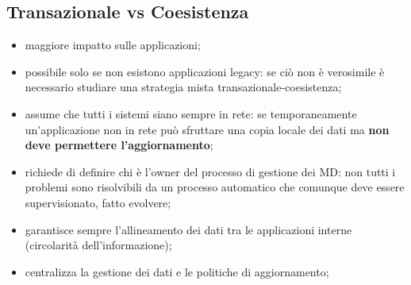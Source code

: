 \documentclass{article}
\begin{document}
\subsection{Transazionale vs Coesistenza}\label{sub:transazionale_vs_coesistenza} %
\begin{note}
    \begin{itemize}
        \item maggiore impatto sulle applicazioni;
        \item possibile solo se non esistono applicazioni legacy: se ciò non è verosimile è necessario studiare una strategia mista transazionale-coesistenza;
        \item assume che tutti i sistemi siano sempre in rete: se temporaneamente un'applicazione non in rete può sfruttare una copia locale dei dati ma \textbf{non deve permettere l'aggiornamento};
        \item richiede di definire chi è l'owner del processo di gestione dei MD: non tutti i problemi sono risolvibili da un processo automatico che comunque deve essere supervisionato, fatto evolvere;
    \end{itemize}
\end{note}
\begin{note}
    \begin{itemize}
        \item garantisce sempre l'allineamento dei dati tra le applicazioni interne (circolarità dell'informazione);
        \item centralizza la gestione dei dati e le politiche di aggiornamento;
    \end{itemize}
\end{note}
\end{document}
